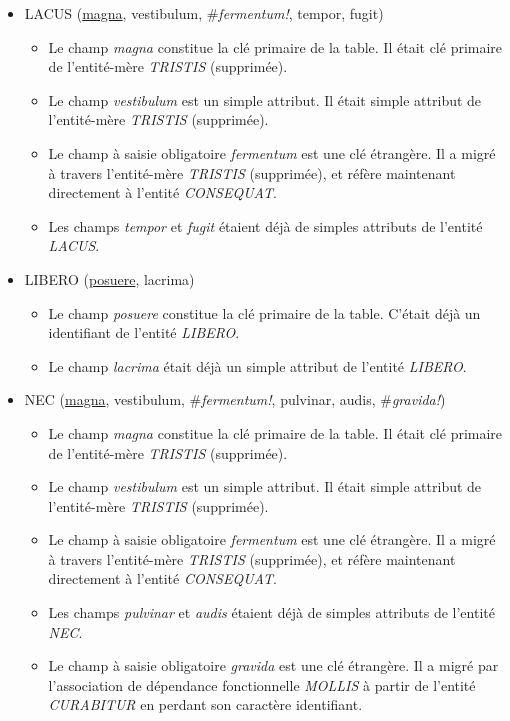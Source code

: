 \documentclass[a4paper]{article}
\newcommand{\relat}[1]{\textsc{#1}}
\newcommand{\attr}[1]{#1}
\newcommand{\prim}[1]{\uline{#1}}
\newcommand{\foreign}[1]{\#\textsl{#1}}
\begin{document}
\begin{itemize}
  \item \relat{LACUS} (\prim{magna}, \attr{vestibulum}, \foreign{fermentum!}, \attr{tempor}, \attr{fugit})
  \begin{itemize}
    \item Le champ \emph{magna} constitue la clé primaire de la table. Il était clé primaire de l'entité-mère \emph{TRISTIS} (supprimée).
    \item Le champ \emph{vestibulum} est un simple attribut. Il était simple attribut de l'entité-mère \emph{TRISTIS} (supprimée).
    \item Le champ à saisie obligatoire \emph{fermentum} est une clé étrangère. Il a migré à travers l'entité-mère \emph{TRISTIS} (supprimée), et réfère maintenant directement à l'entité \emph{CONSEQUAT}.
    \item Les champs \emph{tempor} et \emph{fugit} étaient déjà de simples attributs de l'entité \emph{LACUS}.
  \end{itemize}

  \item \relat{LIBERO} (\prim{posuere}, \attr{lacrima})
  \begin{itemize}
    \item Le champ \emph{posuere} constitue la clé primaire de la table. C'était déjà un identifiant de l'entité \emph{LIBERO}.
    \item Le champ \emph{lacrima} était déjà un simple attribut de l'entité \emph{LIBERO}.
  \end{itemize}

  \item \relat{NEC} (\prim{magna}, \attr{vestibulum}, \foreign{fermentum!}, \attr{pulvinar}, \attr{audis}, \foreign{gravida!})
  \begin{itemize}
    \item Le champ \emph{magna} constitue la clé primaire de la table. Il était clé primaire de l'entité-mère \emph{TRISTIS} (supprimée).
    \item Le champ \emph{vestibulum} est un simple attribut. Il était simple attribut de l'entité-mère \emph{TRISTIS} (supprimée).
    \item Le champ à saisie obligatoire \emph{fermentum} est une clé étrangère. Il a migré à travers l'entité-mère \emph{TRISTIS} (supprimée), et réfère maintenant directement à l'entité \emph{CONSEQUAT}.
    \item Les champs \emph{pulvinar} et \emph{audis} étaient déjà de simples attributs de l'entité \emph{NEC}.
    \item Le champ à saisie obligatoire \emph{gravida} est une clé étrangère. Il a migré par l'association de dépendance fonctionnelle \emph{MOLLIS} à partir de l'entité \emph{CURABITUR} en perdant son caractère identifiant.
  \end{itemize}


\end{itemize}
\end{document}
